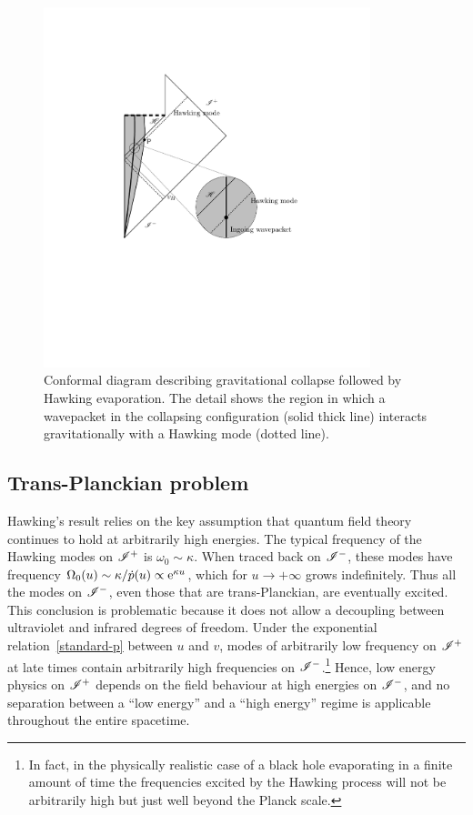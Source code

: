 \documentclass[groupedaddress, showpacs, showkeys, onecolumn, nofootinbib, 12pt]{revtex4}
\begin{document}
%
\begin{figure}[tb]
\begin{center}
\includegraphics[width=9.5cm]{figura.pdf}
\end{center}
\caption{Conformal diagram describing gravitational collapse followed by Hawking evaporation.  The detail shows the region in which a wavepacket in the collapsing configuration (solid thick line) interacts gravitationally with a Hawking mode (dotted line).}
\label{figure1}
\end{figure}
%

\subsection{Trans-Planckian problem}
\label{subsec:tP}

Hawking's result relies on the key assumption that quantum field theory continues to hold at arbitrarily high energies.  The typical frequency of the Hawking modes on $\mathscr{I}^+$ is $\omega_0\sim\kappa$.  When traced back on $\mathscr{I}^-$, these modes have frequency $\Omega_0(u)\sim\kappa/\dot{p}(u) \propto {\mathrm e}^{\kappa u}$, which for $u\rightarrow +\infty$ grows indefinitely.  Thus all the modes on $\mathscr{I}^-$, even those that are trans-Planckian, are eventually excited.  This conclusion is problematic because it does not allow a decoupling between ultraviolet and infrared degrees of freedom.  Under the exponential relation~\eqref{standard-p} between $u$ and $v$, modes of arbitrarily low frequency on $\mathscr{I}^+$ at late times contain arbitrarily high frequencies on $\mathscr{I}^-$.\footnote{ In fact, in the physically realistic case of a black hole evaporating in a finite amount of time the frequencies excited by the Hawking process will not be arbitrarily high but  just well beyond the Planck scale.}  Hence, low energy physics on $\mathscr{I}^+$ depends on the field behaviour at high energies on $\mathscr{I}^-$, and no separation between a ``low energy'' and a ``high energy'' regime is applicable throughout the entire  spacetime.  
\end{document}
